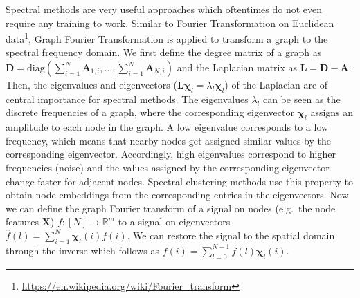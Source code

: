 \documentclass{article}
\begin{document}
Spectral methods are very useful approaches which oftentimes do not even require any training to work. Similar to Fourier Transformation on Euclidean data\footnote{\href{https://en.wikipedia.org/wiki/Fourier\_transform}{https://en.wikipedia.org/wiki/Fourier\_transform}}, Graph Fourier Transformation is applied to transform a graph to the spectral frequency domain.
We first define the degree matrix of a graph as $\mathbf{D}=\textrm{diag}(\sum_{i =1}^{N} \mathbf{A}_{1,i}, \ldots, \sum_{i =1}^{N} \mathbf{A}_{N,i})$ and the Laplacian matrix as $\mathbf{L} =\mathbf{D}-\mathbf{A}$. Then, the eigenvalues and eigenvectors ($\mathbf{L} \mathbf{\chi}_l = \lambda_l \mathbf{\chi}_l$) of the Laplacian are of central importance for spectral methods. The eigenvalues $\lambda_l$ can be seen as the discrete frequencies of a graph, where the corresponding eigenvector $\mathbf{\chi}_l$ assigns an amplitude to each node in the graph. A low eigenvalue corresponds to a low frequency, which means that nearby nodes get assigned similar values by the corresponding eigenvector. %
 Accordingly, high eigenvalues correspond to higher frequencies (noise) and the values assigned by the corresponding eigenvector change faster for adjacent nodes. %
 Spectral clustering methods \cite{ng2002spectral} use this property to obtain node embeddings from the corresponding entries in the eigenvectors.
Now we can define the graph Fourier transform of a signal on nodes (e.g.\ the node features $\mathbf{X}$) $f:[N] \to \mathbb{R}^m$ to a signal on eigenvectors $\hat{f}(l) =\sum_{i = 1}^{N}\mathbf{\chi}_l(i)f(i)$. We can restore the signal to the spatial domain through the inverse which follows as $f(i) = \sum_{l = 0}^{N-1}\hat{f}(l) \mathbf{\chi}_l(i)$. 
\end{document}
